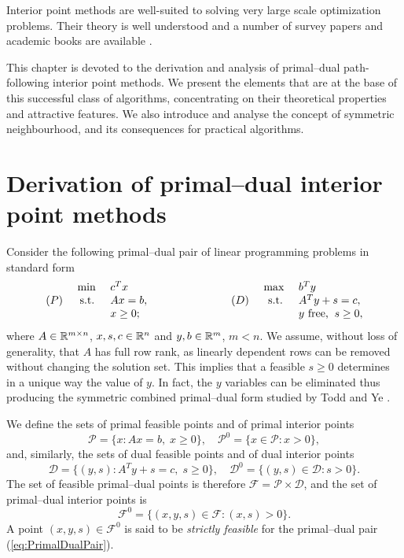 
%
%
\label{ch:Ipm}

Interior point methods are well-suited to solving very
large scale optimization problems. Their theory is well understood
and a number of survey papers and academic books are available
\cite{GondzioTerlaky,Gonzaga92,
RoosTerlakyVial,Terlaky96,MWright92,ipm:Wright97}.

This chapter is devoted to the derivation and analysis of primal--dual
path-following interior point methods. 
We present the elements that are at the base of this successful class
of algorithms, concentrating on their theoretical properties and
attractive features.
We also introduce and analyse the concept of symmetric neighbourhood,
and its consequences for practical algorithms.


%
%
\section{Derivation of primal--dual interior point methods}
\label{sec:Derivation}

Consider the following primal--dual pair of linear programming problems 
in standard form
%
\begin{eqnarray} \label{eq:PrimalDualPair}
  \begin{array}{crlp{2cm}crl}
     & \mbox{ min } & c^T x     &  &     & \mbox{ max }  & b^T y \\
 (P) &\mbox{ s.t. } & Ax = b,   &  & (D) & \mbox{ s.t. } & A^T y + s = c, \\
     &              & x \geq 0; &  &     &   & y \mbox{ free,} \;\; s \geq 0,
  \end{array}
\end{eqnarray}
%
where $A \in \mathbb{R}^{m \times n}$, $x, s, c \in \mathbb{R}^{n}$ 
and $y, b \in \mathbb{R}^{m}$, $m<n$. We assume, without loss of generality,
that $A$ has full row rank, as linearly dependent rows can be
removed without changing the solution set.
This implies that a feasible $s \ge 0$ determines in a unique
way the value of $y$.
In fact, the $y$ variables can be eliminated thus producing the
symmetric combined primal--dual form studied by Todd and Ye \cite{ToddYe90}.

We define the sets of primal feasible points and of
primal interior points 
\[
\mathcal{P} = \{ x : Ax = b, \; x \ge 0 \}, \quad
\mathcal{P}^0 = \{ x \in \mathcal{P} : x > 0 \},
\]
and, similarly, the sets of dual feasible points and of
dual interior points
\[
\mathcal{D} = \{ (y,s) : A^T y + s = c, \; s \ge 0 \}, \quad
\mathcal{D}^0 = \{ (y,s) \in \mathcal{D} : s > 0 \}.
\]
The set of feasible primal--dual points is therefore
$\mathcal{F} = \mathcal{P} \times \mathcal{D}$, and the set of primal--dual
interior points is
\[
\mathcal{F}^0 = \{ (x,y,s) \in \mathcal{F} : (x,s) > 0 \}.
\]
A point $(x,y,s) \in \mathcal{F}^0$ is said to be {\em strictly feasible}
for the primal--dual pair (\ref{eq:PrimalDualPair}).

